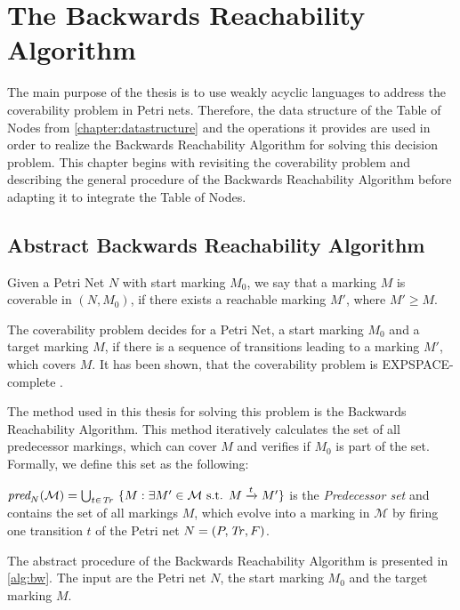 \chapter{The Backwards Reachability Algorithm}\label{chapter:coverability}

The main purpose of the thesis is to use weakly acyclic languages to address the coverability problem in Petri nets. Therefore, the data structure of the Table of Nodes from \autoref{chapter:datastructure} and the operations it provides are used in order to realize the Backwards Reachability Algorithm for solving this decision problem. This chapter begins with revisiting the coverability problem and describing the general procedure of the Backwards Reachability Algorithm before adapting it to integrate the  Table of Nodes.

\section{Abstract Backwards Reachability Algorithm}\label{sec:abstractbw} 
Given a Petri Net $N$ with start marking $M_{0}$, we say that a marking $M$ is coverable in $(N,M_{0})$, if there exists a reachable marking $M'$, where $M'\ge M$. 

The coverability problem decides for a Petri Net, a start marking $M_{0}$ and a target marking $M$, if there is a sequence of transitions leading to a marking $M'$, which covers $M$. It has been shown, that the coverability problem is EXPSPACE-complete \cite{lipton_76,rackoff_78}. 


\par
The method used in this thesis for solving this problem is the Backwards Reachability Algorithm. This method iteratively calculates the set of all predecessor markings, which can cover $M$ and verifies if $M_{0}$ is part of the set. Formally, we define this set as the following:
\begin{definition}\label{def:ppre}
$\operatorname{\textit{pred}}_{N}(\mathcal{M}) = \bigcup_{t \in \mathit{Tr}} \ \{M : \exists  M' \in \mathcal{M} \text{ s.t. }  M \xrightarrow{t} M'\}$ is the \emph{Predecessor set} and contains the set of all markings $M$, which evolve into a marking in $\mathcal{M}$ by firing one transition $t$ of the Petri net $N = (P,\mathit{Tr},F)$.
\end{definition}
\par 
The abstract procedure of the Backwards Reachability Algorithm is presented in \autoref{alg:bw}. The input are the Petri net $N$, the start marking $M_{0}$ and the target marking $M$. 

